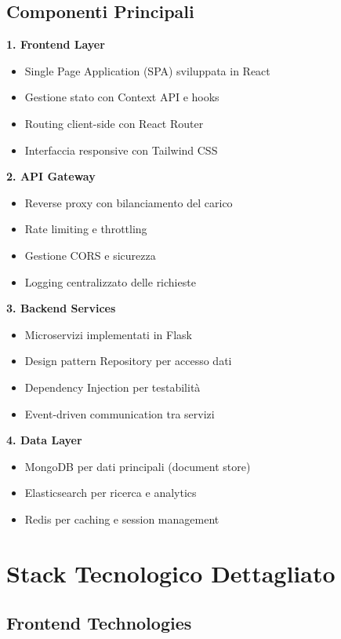 \documentclass[12pt,a4paper]{report}
\begin{document}
\subsection{Componenti Principali}

\textbf{1. Frontend Layer}
\begin{itemize}
    \item Single Page Application (SPA) sviluppata in React
    \item Gestione stato con Context API e hooks
    \item Routing client-side con React Router
    \item Interfaccia responsive con Tailwind CSS
\end{itemize}

\textbf{2. API Gateway}
\begin{itemize}
    \item Reverse proxy con bilanciamento del carico
    \item Rate limiting e throttling
    \item Gestione CORS e sicurezza
    \item Logging centralizzato delle richieste
\end{itemize}

\textbf{3. Backend Services}
\begin{itemize}
    \item Microservizi implementati in Flask
    \item Design pattern Repository per accesso dati
    \item Dependency Injection per testabilità
    \item Event-driven communication tra servizi
\end{itemize}

\textbf{4. Data Layer}
\begin{itemize}
    \item MongoDB per dati principali (document store)
    \item Elasticsearch per ricerca e analytics
    \item Redis per caching e session management
\end{itemize}

\section{Stack Tecnologico Dettagliato}

\subsection{Frontend Technologies}
\end{document}
